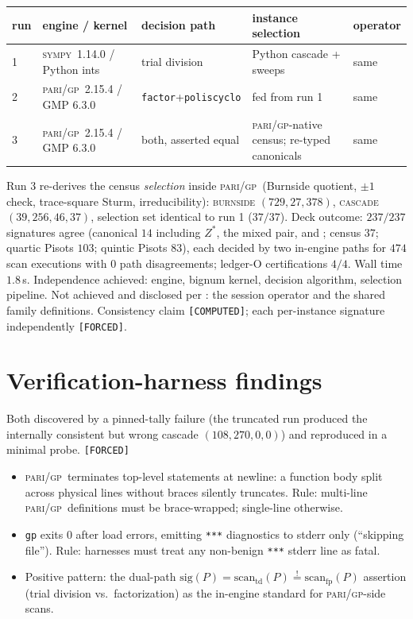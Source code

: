 \documentclass[11pt]{article}
\newcommand{\F}{\textnormal{\texttt{[FORCED]}}}
\newcommand{\C}{\textnormal{\texttt{[COMPUTED]}}}
\newcommand{\gp}{\textsc{pari/gp}}
\newcommand{\sy}{\textsc{sympy}}
\theoremstyle{definition}
\begin{document}
\begin{center}
\footnotesize
\begin{tabular}{lllll}
\hline
run & engine / kernel & decision path & instance selection & operator\\
\hline
1 & \sy~1.14.0 / Python ints & trial division & Python cascade + sweeps & same\\
2 & \gp~2.15.4 / GMP 6.3.0 & \texttt{factor}+\texttt{poliscyclo} & fed from run 1 & same\\
3 & \gp~2.15.4 / GMP 6.3.0 & both, asserted equal & \gp-native census; re-typed canonicals & same\\
\hline
\end{tabular}
\end{center}

Run 3 re-derives the census \emph{selection} inside \gp\ (Burnside quotient,
$\pm1$ check, trace-square Sturm, irreducibility): \textsc{burnside}
$(729,27,378)$, \textsc{cascade} $(39,256,46,37)$, selection set identical to
run 1 ($37/37$). Deck outcome: $237/237$ signatures agree
(canonical $14$ including $Z^{*}$, the mixed pair, and \cite[Ex.~7.18]{relcharge};
census $37$; quartic Pisots $103$; quintic Pisots $83$), each decided by two
in-engine paths for $474$ scan executions with $0$ path disagreements; ledger-O
certifications $4/4$. Wall time $1.8$\,s. Independence achieved: engine, bignum
kernel, decision algorithm, selection pipeline. Not achieved and disclosed per
\cite[\S9]{relcharge}: the session operator and the shared family definitions.
Consistency claim \C; each per-instance signature independently \F.

\section{Verification-harness findings}\label{sec:harness}

Both discovered by a pinned-tally failure (the truncated run produced the
internally consistent but wrong cascade $(108,270,0,0)$) and reproduced in a
minimal probe. \F

\begin{itemize}
\item[\textbf{H1.}] \gp\ terminates top-level statements at newline: a function
body split across physical lines without braces silently truncates. Rule:
multi-line \gp\ definitions must be brace-wrapped; single-line otherwise.
\item[\textbf{H2.}] \texttt{gp} exits $0$ after load errors, emitting
\texttt{***} diagnostics to stderr only (``skipping file''). Rule: harnesses
must treat any non-benign \texttt{***} stderr line as fatal.
\item[\textbf{H3.}] Positive pattern: the dual-path
$\mathrm{sig}(P)=\mathrm{scan}_{\mathrm{td}}(P)\overset{!}{=}\mathrm{scan}_{\mathrm{fp}}(P)$
assertion (trial division vs.\ factorization) as the in-engine standard for
\gp-side scans.
\end{itemize}
\end{document}
